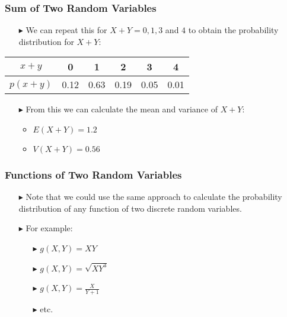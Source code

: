 \documentclass[12pt]{beamer}
\begin{document}
\begin{frame}
	\frametitle{Sum of Two Random Variables}
	
	\begin{itemize}
		\item[\color{blue}$\blacktriangleright$] We can repeat this for $X + Y = 0, 1, 3$ and $4$ to obtain the probability distribution for $X + Y$:
	\end{itemize}
	
	\vspace{0.3cm}
	
	\begin{center}
		\begin{tabular}{|c|c|c|c|c|c|}
			\hline
			$x + y$ & 0 & 1 & 2 & 3 & 4 \\
			\hline
			$p(x + y)$ & 0.12 & 0.63 & 0.19 & 0.05 & 0.01 \\
			\hline
		\end{tabular}
	\end{center}
	
	\vspace{0.3cm}
	
	\begin{itemize}
		\item[\color{blue}$\blacktriangleright$] From this we can calculate the mean and variance of $X + Y$:
		\begin{itemize}
			\item $E(X + Y) = 1.2$
			\item $V(X + Y) = 0.56$
		\end{itemize}
	\end{itemize}
	
\end{frame}

\begin{frame}
	\frametitle{Functions of Two Random Variables}
	
	\begin{itemize}
		\item[\color{blue}$\blacktriangleright$] Note that we could use the same approach to calculate the probability distribution of any function of two discrete random variables.
		\item[\color{blue}$\blacktriangleright$] For example:
		\begin{itemize}
			\item[\color{blue}$\blacktriangleright$] $g(X,Y) = XY$
			\item[\color{blue}$\blacktriangleright$] $g(X,Y) = \sqrt{XY^3}$
			\item[\color{blue}$\blacktriangleright$] $g(X,Y) = \frac{X}{Y+1}$
			\item[\color{blue}$\blacktriangleright$] etc.
		\end{itemize}
	\end{itemize}
	
\end{frame}
\end{document}
